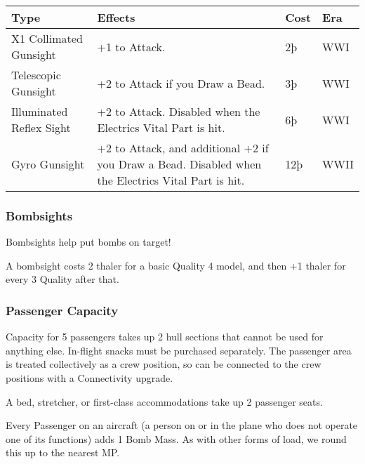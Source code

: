 \documentclass{article}
\begin{document}
\begin{tabular}{|l|l|l|l|}
    \hline
    Type                                                  & Effects                                        & Cost & Era \\\hline
    X1 Collimated Gunsight                                & +1 to Attack.                                  & 2þ   & WWI \\\hline
    Telescopic Gunsight                                   & +2 to Attack if you Draw a Bead.               & 3þ   & WWI \\\hline
    Illuminated Reflex Sight                              & +2 to Attack. Disabled when the Electrics
    Vital Part is hit.                                    & 6þ                                             & WWI        \\\hline
    Gyro Gunsight                                         & {+2 to Attack, and additional +2 if you Draw a
    Bead. Disabled when the Electrics Vital Part is hit.} & {12þ}                                          &
    {WWII}                                                                                                              \\\hline
\end{tabular}

\subsubsection{Bombsights}
\label{_Bombsights}

Bombsights help put bombs on target!

A bombsight costs 2 thaler for a basic Quality 4 model, and then
+1 thaler for every 3 Quality after that.

\subsubsection{Passenger Capacity}
\label{_Passenger_Capacity}

Capacity for 5 passengers takes up 2 hull sections that cannot be used
for anything else. In-flight snacks must be purchased separately. The
passenger area is treated collectively as a crew position, so can be
connected to the crew positions with a Connectivity upgrade.

A bed, stretcher, or first-class accommodations take up 2
passenger seats.

Every Passenger on an aircraft (a person on or in the plane who
does not operate one of its functions) adds 1 Bomb Mass. As with other
forms of load, we round this up to the nearest MP.
\end{document}

